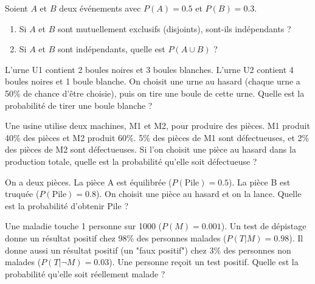 \begin{exercicebox}
Soient $A$ et $B$ deux événements avec $P(A)=0.5$ et $P(B)=0.3$.
\begin{enumerate}
    \item Si $A$ et $B$ sont mutuellement exclusifs (disjoints), sont-ils indépendants ?
    \item Si $A$ et $B$ sont indépendants, quelle est $P(A \cup B)$ ?
\end{enumerate}
\end{exercicebox}


\begin{exercicebox}
L'urne U1 contient 2 boules noires et 3 boules blanches. L'urne U2 contient 4 boules noires et 1 boule blanche.
On choisit une urne au hasard (chaque urne a 50\% de chance d'être choisie), puis on tire une boule de cette urne.
Quelle est la probabilité de tirer une boule blanche ?
\end{exercicebox}

\begin{exercicebox}
Une usine utilise deux machines, M1 et M2, pour produire des pièces. M1 produit 40\% des pièces et M2 produit 60\%. 5\% des pièces de M1 sont défectueuses, et 2\% des pièces de M2 sont défectueuses.
Si l'on choisit une pièce au hasard dans la production totale, quelle est la probabilité qu'elle soit défectueuse ?
\end{exercicebox}

\begin{exercicebox}
On a deux pièces. La pièce A est équilibrée ($P(\text{Pile})=0.5$). La pièce B est truquée ($P(\text{Pile})=0.8$).
On choisit une pièce au hasard et on la lance. Quelle est la probabilité d'obtenir Pile ?
\end{exercicebox}


\begin{exercicebox}
Une maladie touche 1 personne sur 1000 ($P(M)=0.001$). Un test de dépistage donne un résultat positif chez 98\% des personnes malades ($P(T|M)=0.98$). Il donne aussi un résultat positif (un "faux positif") chez 3\% des personnes non malades ($P(T|\neg M)=0.03$).
Une personne reçoit un test positif. Quelle est la probabilité qu'elle soit réellement malade ?
\end{exercicebox}

